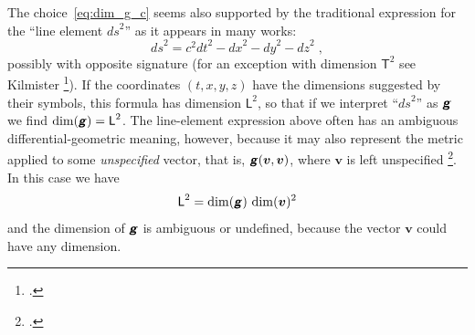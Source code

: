 \documentclass[\ifafour a4paper,12pt,\else a5paper,10pt,\fi%
onecolumn,oneside,article,%
british%
]{memoir}
\theoremstyle{remark}
\theoremstyle{innote}
\newcommand*{\mathte}[1]{\textbf{\textit{\textsf{#1}}}}
\newcommand*{\citep}{\footcites}
\renewcommand*{\|}[1][]{\nonscript\,#1\vert\nonscript\;\mathopen{}}
\newcommand*{\sect}{\S}%
\newcommand*{\chap}{ch.}%
\newcommand*{\cf}{{cf.}}
\newcommand*{\Le}{\textsf{L}}
\newcommand*{\Ti}{\textsf{T}}
\newcommand*{\yg}{\mathte{g}}
\newcommand*{\ygc}{\mathte{g}}
\newcommand*{\yv}{\bm{v}}
\newcommand*{\ds}{\mathit{ds}}
\begin{document}
The choice~\eqref{eq:dim_g_c} seems also supported by the traditional
expression for the \enquote{line element $\ds^{2}$} as it appears in many
works:
\begin{equation}
  \label{eq:line_elem}
  \ds^{2} = c^2\mathit{dt}^2 - \mathit{dx}^2 -\mathit{dy}^2 - \mathit{dz}^2
  \;,
\end{equation}
possibly with opposite signature (for an exception with dimension $\Ti^{2}$
see Kilmister \citep[\chap~II p.~25]{kilmister1973}{kilmister1973}). If the
coordinates $(t,x,y,z)$ have the dimensions suggested by their symbols,
this formula has dimension $\Le^{2}$, so that if we interpret
\enquote{$\ds^{2}$} as $\ygc$ we find $\dim(\ygc) = \Le^{2}$. The
line-element expression above often has an ambiguous differential-geometric
meaning, however, because it may also represent the metric applied to some
\emph{unspecified} vector, that is, $\yg(\yv,\yv)$, where $\yv$ is left
unspecified \citep[\cf][Box~3.2~D p.~77]{misneretal1970_r1973}. In this
case we have
\begin{equation}
  \label{eq:line_elem_dim_ambiguous}
  \Le^{2} = \dim(\yg)\,\dim(\yv)^{2}
\end{equation}
and the dimension of $\yg$ is ambiguous or undefined, because the vector
$\yv$ could have any dimension.%

\medskip
\end{document}
